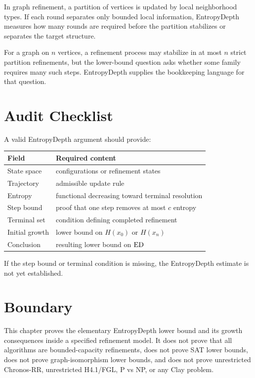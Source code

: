 In graph refinement, a partition of vertices is updated by local neighborhood
types. If each round separates only bounded local information, EntropyDepth
measures how many rounds are required before the partition stabilizes or
separates the target structure.

For a graph on \(n\) vertices, a refinement process may stabilize in at most
\(n\) strict partition refinements, but the lower-bound question asks whether
some family requires many such steps. EntropyDepth supplies the bookkeeping
language for that question.

\section{Audit Checklist}

A valid EntropyDepth argument should provide:

\begin{center}
\begin{tabular}{ll}
\toprule
Field & Required content \\
\midrule
State space & configurations or refinement states \\
Trajectory & admissible update rule \\
Entropy & functional decreasing toward terminal resolution \\
Step bound & proof that one step removes at most \(c\) entropy \\
Terminal set & condition defining completed refinement \\
Initial growth & lower bound on \(H(x_0)\) or \(H(x_n)\) \\
Conclusion & resulting lower bound on \(\mathrm{ED}\) \\
\bottomrule
\end{tabular}
\end{center}

If the step bound or terminal condition is missing, the EntropyDepth estimate
is not yet established.

\section{Boundary}

This chapter proves the elementary EntropyDepth lower bound and its growth
consequences inside a specified refinement model. It does not prove that all
algorithms are bounded-capacity refinements, does not prove SAT lower bounds,
does not prove graph-isomorphism lower bounds, and does not prove unrestricted
Chronos-RR, unrestricted H4.1/FGL, P vs NP, or any Clay problem.
